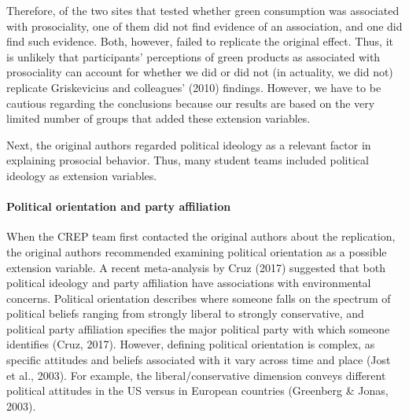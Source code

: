 \documentclass[
]{article}
\begin{document}
Therefore, of the two sites that tested whether green consumption was
associated with prosociality, one of them did not find evidence of an
association, and one did find such evidence. Both, however, failed to
replicate the original effect. Thus, it is unlikely that participants'
perceptions of green products as associated with prosociality can
account for whether we did or did not (in actuality, we did not)
replicate Griskevicius and colleagues' (2010) findings. However, we have
to be cautious regarding the conclusions because our results are based
on the very limited number of groups that added these extension
variables.

Next, the original authors regarded political ideology as a relevant
factor in explaining prosocial behavior. Thus, many student teams
included political ideology as extension variables.

\paragraph{Political orientation and party
affiliation}\label{political-orientation-and-party-affiliation}

When the CREP team first contacted the original authors about the
replication, the original authors recommended examining political
orientation as a possible extension variable. A recent meta-analysis by
Cruz (2017) suggested that both political ideology and party affiliation
have associations with environmental concerns. Political orientation
describes where someone falls on the spectrum of political beliefs
ranging from strongly liberal to strongly conservative, and political
party affiliation specifies the major political party with which someone
identifies (Cruz, 2017). However, defining political orientation is
complex, as specific attitudes and beliefs associated with it vary
across time and place (Jost et al., 2003). For example, the
liberal/conservative dimension conveys different political attitudes in
the US versus in European countries (Greenberg \& Jonas, 2003).
\end{document}
